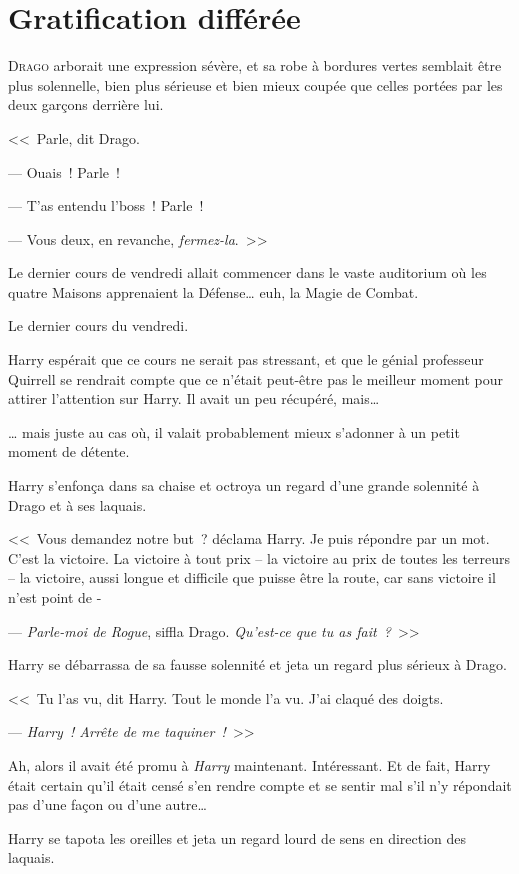 \chapter{Gratification différée}

\lettrine{D}{rago} arborait une expression sévère, et sa robe à bordures vertes semblait être plus solennelle, bien plus sérieuse et bien mieux coupée que celles portées par les deux garçons derrière lui.

<<~Parle, dit Drago.

--- Ouais~! Parle~!

--- T'as entendu l'boss~! Parle~!

--- Vous deux, en revanche, \emph{fermez-la}.~>>

Le dernier cours de vendredi allait commencer dans le vaste auditorium où les quatre Maisons apprenaient la Défense… euh, la Magie de Combat.

Le dernier cours du vendredi.

Harry espérait que ce cours ne serait pas stressant, et que le génial professeur Quirrell se rendrait compte que ce n'était peut-être pas le meilleur moment pour attirer l'attention sur Harry. Il avait un peu récupéré, mais…

… mais juste au cas où, il valait probablement mieux s'adonner à un petit moment de détente.

Harry s'enfonça dans sa chaise et octroya un regard d'une grande solennité à Drago et à ses laquais.

<<~Vous demandez notre but~? déclama Harry. Je puis répondre par un mot. C'est la victoire. La victoire à tout prix -- la victoire au prix de toutes les terreurs -- la victoire, aussi longue et difficile que puisse être la route, car sans victoire il n'est point de -

--- \emph{Parle-moi de Rogue}, siffla Drago. \emph{Qu'est-ce que tu as fait~?}~>>

Harry se débarrassa de sa fausse solennité et jeta un regard plus sérieux à Drago.

<<~Tu l'as vu, dit Harry. Tout le monde l'a vu. J'ai claqué des doigts.

--- \emph{Harry~! Arrête de me taquiner~!}~>>

Ah, alors il avait été promu à \emph{Harry} maintenant. Intéressant. Et de fait, Harry était certain qu'il était censé s'en rendre compte et se sentir mal s'il n'y répondait pas d'une façon ou d'une autre…

Harry se tapota les oreilles et jeta un regard lourd de sens en direction des laquais.

